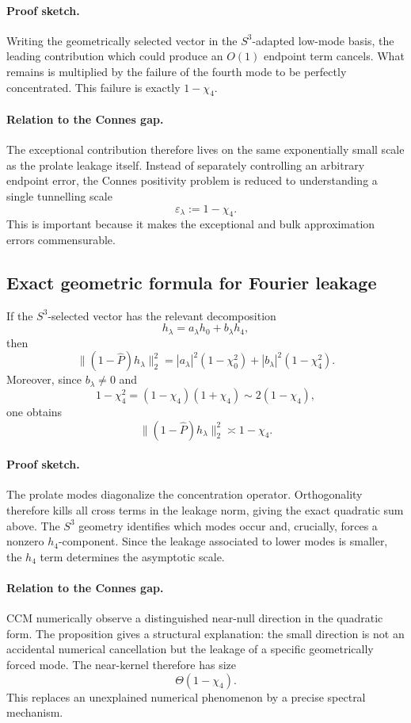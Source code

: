 \paragraph{Proof sketch.}
Writing the geometrically selected vector in the \(S^3\)-adapted low-mode
basis, the leading contribution which could produce an \(O(1)\) endpoint
term cancels.  What remains is multiplied by the failure of the fourth mode
to be perfectly concentrated.  This failure is exactly \(1-\chi_4\).
\paragraph{Relation to the Connes gap.}
The exceptional contribution therefore lives on the same exponentially
small scale as the prolate leakage itself.  Instead of separately controlling
an arbitrary endpoint error, the Connes positivity problem is reduced to
understanding a single tunnelling scale
\[
    \varepsilon_\lambda:=1-\chi_4.
\]
This is important because it makes the exceptional and bulk approximation
errors commensurable.
\subsection{Exact geometric formula for Fourier leakage}
\begin{proposition}
If the \(S^3\)-selected vector has the relevant decomposition
\[
    h_\lambda=a_\lambda h_0+b_\lambda h_4,
\]
then
\[
 \bigl\|(1-\widehat P)h_\lambda\bigr\|_2^2
 =
 |a_\lambda|^2(1-\chi_0^2)
 +
 |b_\lambda|^2(1-\chi_4^2).
\]
Moreover, since \(b_\lambda\neq0\) and
\[
    1-\chi_4^2=(1-\chi_4)(1+\chi_4)
               \sim 2(1-\chi_4),
\]
one obtains
\[
    \bigl\|(1-\widehat P)h_\lambda\bigr\|_2^2
    \asymp 1-\chi_4.
\]
\end{proposition}
\paragraph{Proof sketch.}
The prolate modes diagonalize the concentration operator.  Orthogonality
therefore kills all cross terms in the leakage norm, giving the exact
quadratic sum above.  The \(S^3\) geometry identifies which modes occur and,
crucially, forces a nonzero \(h_4\)-component.  Since the leakage associated
to lower modes is smaller, the \(h_4\) term determines the asymptotic scale.
\paragraph{Relation to the Connes gap.}
CCM numerically observe a distinguished near-null direction in the quadratic
form.  The proposition gives a structural explanation: the small direction
is not an accidental numerical cancellation but the leakage of a specific
geometrically forced mode.  The near-kernel therefore has size
\[
    \Theta(1-\chi_4).
\]
This replaces an unexplained numerical phenomenon by a precise spectral
mechanism.
